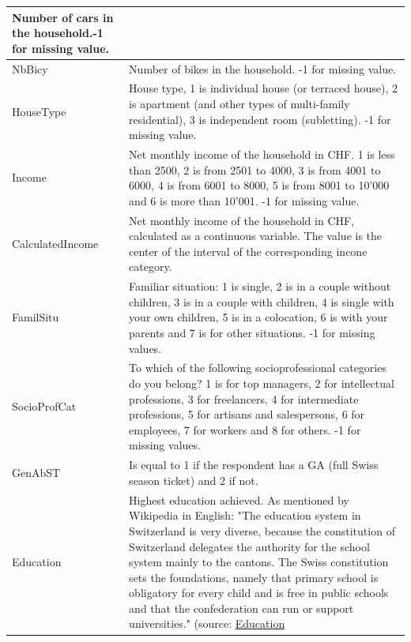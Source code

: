 \documentclass[12pt,a4paper]{article}
\let\OrigUnderscore\_
\def\_{\OrigUnderscore\penalty0\hspace{0pt}}%
\begin{document}
\begin{longtable}{p{4cm}|p{10.5cm}}
                Number of cars in the household.-1 for missing
                value. \tabularnewline \hline NbBicy & Number of bikes
                in the household. -1 for missing value.\tabularnewline
                \hline HouseType & House type, 1 is individual house
                (or terraced house), 2 is apartment (and other types
                of multi-family residential), 3 is independent room
                (subletting). -1 for missing value.\tabularnewline
                \hline Income & Net monthly income of the household in
                CHF. 1 is less than 2500, 2 is from 2501 to 4000, 3 is
                from 4001 to 6000, 4 is from 6001 to 8000, 5 is from
                8001 to 10'000 and 6 is more than 10'001. -1 for
                missing value.\tabularnewline \hline CalculatedIncome
                & Net monthly income of the household in CHF,
                calculated as a continuous variable. The value is the
                center of the interval of the corresponding incone
                category. \tabularnewline \hline FamilSitu & Familiar
                situation: 1 is single, 2 is in a couple without
                children, 3 is in a couple with children, 4 is single
                with your own children, 5 is in a colocation, 6 is
                with your parents and 7 is for other situations. -1
                for missing values.\tabularnewline \hline SocioProfCat
                & To which of the following socioprofessional
                categories do you belong? 1 is for top managers, 2 for
                intellectual professions, 3 for freelancers, 4 for
                intermediate professions, 5 for artisans and
                salespersons, 6 for employees, 7 for workers and 8 for
                others. -1 for missing values.\tabularnewline \hline
                GenAbST & Is equal to 1 if the respondent has a GA
                (full Swiss season ticket) and 2 if
                not.\tabularnewline \hline Education &Highest
                education achieved. As mentioned by Wikipedia in
                English: "The education system in Switzerland is very
                diverse, because the constitution of Switzerland
                delegates the authority for the school system mainly
                to the cantons. The Swiss constitution sets the
                foundations, namely that primary school is obligatory
                for every child and is free in public schools and that
                the confederation can run or support universities."
                (source:
                \href{http://en.wikipedia.org/wiki/Education\_in\_Switzerland}{Education
}
\end{longtable}
\end{document}
